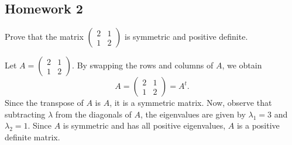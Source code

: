 \subsection*{Homework 2}
\begin{problem}
  Prove that the matrix
  \(
\begin{pmatrix}
    2 & 1\\
    1 & 2
  \end{pmatrix}
\) is symmetric and positive definite.
\end{problem}

\begin{solution}
  Let \(A =
\begin{pmatrix}
    2 & 1\\
    1 & 2
  \end{pmatrix}
\). By swapping the rows and columns of \(A\), we obtain
  \[
A =
\begin{pmatrix}
    2 & 1\\
    1 & 2
  \end{pmatrix}
= A^{t}.
\]
  Since the transpose of \(A\) is \(A\), it is a symmetric matrix. Now, observe that subtracting \(\lambda\) from the diagonals of \(A\), the eigenvalues are given by \(\lambda_{1} = 3\) and \(\lambda_{2} = 1\). Since \(A\) is symmetric and has all positive eigenvalues, \(A\) is a positive definite matrix.
\end{solution}


